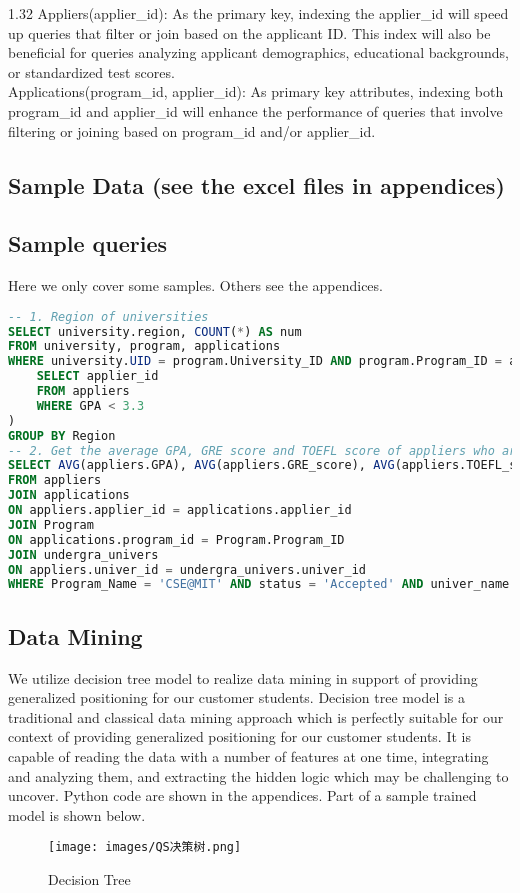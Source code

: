\documentclass[12pt, a4paper]{article}
\begin{document}
\begin{spacing}{1.32}
Appliers(applier\_id): As the primary key, indexing the applier\_id will speed up queries that filter or join based on the applicant ID. This index will also be beneficial for queries analyzing applicant demographics, educational backgrounds, or standardized test scores.\\

Applications(program\_id, applier\_id): As primary key attributes, indexing both program\_id and applier\_id will enhance the performance of queries that involve filtering or joining based on program\_id and/or applier\_id.\\

\subsection{Sample Data (see the excel files in appendices)}
\subsection{Sample queries}
Here we only cover some samples. Others see the appendices.
\begin{lstlisting}[language=SQL]
-- 1. Region of universities
SELECT university.region, COUNT(*) AS num
FROM university, program, applications
WHERE university.UID = program.University_ID AND program.Program_ID = applications.program_id AND applications.status = 'Accepted' AND applications.applier_id IN (
    SELECT applier_id
    FROM appliers
    WHERE GPA < 3.3
)
GROUP BY Region
-- 2. Get the average GPA, GRE score and TOEFL score of appliers who are accepted by CSE@MIT in 2022
SELECT AVG(appliers.GPA), AVG(appliers.GRE_score), AVG(appliers.TOEFL_score) 
FROM appliers
JOIN applications
ON appliers.applier_id = applications.applier_id
JOIN Program
ON applications.program_id = Program.Program_ID
JOIN undergra_univers
ON appliers.univer_id = undergra_univers.univer_id
WHERE Program_Name = 'CSE@MIT' AND status = 'Accepted' AND univer_name = 'Chinese University of Hong Kong, Shenzhen' AND YEAR(applications.date) = 2022;
\end{lstlisting}

\subsection{Data Mining}
We utilize decision tree model to realize data mining in support of providing generalized positioning for our customer students. Decision tree model is a traditional and classical data mining approach which is perfectly suitable for our context of providing generalized positioning for our customer students. It is capable of reading the data with a number of features at one time, integrating and analyzing them, and extracting the hidden logic which may be challenging to uncover. Python code are shown in the appendices. Part of a sample trained model is shown below.
\begin{figure}[htbp]
    \centering
    \texttt{[image: images/QS决策树.png]}
    \caption{Decision Tree}
    \label{fig:my_label}
\end{figure}



\end{spacing}
\end{document}
